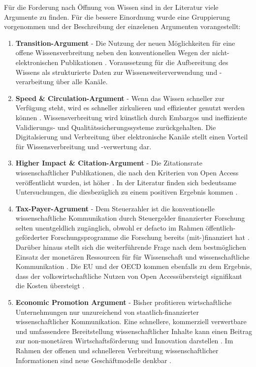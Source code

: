 Für die Forderung nach Öffnung von Wissen sind in der Literatur viele Argumente zu finden. Für die bessere Einordnung wurde eine Gruppierung vorgenommen und der Beschreibung der einzelenen Argumenten vorangestellt:
\begin{enumerate}
\item \textbf{Transition-Argument} - Die Nutzung der neuen Möglichkeiten für eine offene Wissensverbreitung neben den konventionellen Wegen der nicht-elektronischen Publikationen \cite{berliner_erklaerung_2003}. Voraussetzung für die Aufbereitung des Wissens als strukturierte Daten zur Wissensweiterverwendung und -verarbeitung über alle Kanäle.
\item \textbf{Speed & Circulation-Argument} - Wenn das Wissen schneller zur Verfügung steht, wird es schneller zirkulieren und effizienter genutzt werden können \cite{Woelfle_2011}. Wissensverbreitung wird künstlich durch Embargos und ineffiziente Validierungs- und Qualitätssicherungssysteme zurückgehalten. Die Digitalsierung und Verbreitung über elektronische Kanäle stellt einen Vorteil für Wissensverbreitung und -verwertung dar. 
\item \textbf{Higher Impact & Citation-Argument} - Die Zitationsrate wissenschaftlicher Publikationen, die nach den Kriterien von Open Access veröffentlicht wurden, ist höher \cite{cite:21a}. In der Literatur finden sich bedeutsame Untersuchungen, die diesbezüglich zu einem positiven Ergebnis kommen \cite{Lawrence_2001} \cite{Jeffrey_2008} \cite{Eysenbach_2006} \cite{Antelman_2004}.
\item \textbf{Tax-Payer-Agrument} - Dem Steuerzahler ist die konventionelle wissenschaftliche Kommunikation durch Steuergelder finanzierter Forschung selten unentgeldlich zugänglich, obwohl er defacto im Rahmen öffentlich-geförderter Forschungsprogramme die Forschung bereits (mit-)finanziert hat \cite{suber_2003_taxpayer} \cite{Adema_2014_open_access}. Darüber hinaus stellt sich die weiterführende Frage nach dem bestmöglichen Einsatz der monetären Ressourcen für für Wissenschaft und wissenschaftliche Kommunikation \cite{Glasziou_2014} \cite{altman_1994_scandal}. Die EU und der OECD kommen ebenfalls zu dem Ergebnis, dass der volkswirtschaftliche Nutzen von Open Accessübersteigt signifikant die Kosten übersteigt \cite{WD_bundestag_2009}. 
\item \textbf{Economic Promotion Argument} - Bisher profitieren wirtschaftliche Unternehmungen nur unzureichend von staatlich-finanzierter wissenschaftlicher Kommunikation. Eine schnellere, kommerziell verwertbare und umfassendere Bereitstellung wissenschaftlicher Inhalte kann einen Beitrag zur non-monetären Wirtschaftsförderung und Innovation darstellen \cite{heise_2012} \cite{suchen OECD EU}. Im Rahmen der offenen und schnelleren Verbreitung wissenschaftlicher Informationen sind neue Geschäftmodelle denkbar \cite{suchen}.

\end{enumerate}
